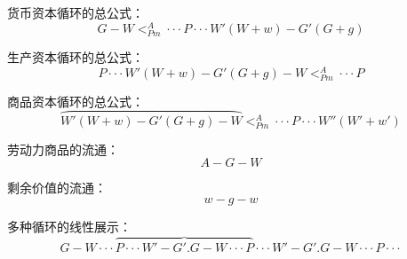 \documentclass[a4paper,11pt]{ctexart}
\title{}
\author{}
\begin{document}
\maketitle
\tableofcontents

\begin{abstract}
\end{abstract}

\section{}

货币资本循环的总公式：$$G - W < ^{A}_{Pm} \cdot\cdot\cdot P \cdot\cdot\cdot W'(W + w) - G'(G + g)$$

生产资本循环的总公式：$$P \cdot\cdot\cdot W'(W + w) - G'(G + g) - W < ^{A}_{Pm} \cdot\cdot\cdot P$$

商品资本循环的总公式：$$\wideparen{W'(W + w) - G'(G + g) - W} < ^{A}_{Pm} \cdot\cdot\cdot P \cdot\cdot\cdot W''(W' + w')$$

劳动力商品的流通：$$A - G - W$$

剩余价值的流通：$$w - g - w$$

多种循环的线性展示：$$G - W \cdot\cdot\cdot \overbrace{P \cdot\cdot\cdot W' - G' . G - W \cdot\cdot\cdot P} \cdot\cdot\cdot W' - G' . G - W \cdot\cdot\cdot P \cdot\cdot\cdot$$
\end{document}
